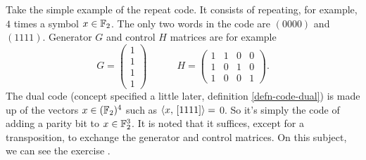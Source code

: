  
\begin{exmp}
Take the simple example of the repeat code. It consists of repeating, for example, $ 4 $ times a symbol $ x \in \mathbb{F}_2 $. The only two words in the code are $ (0000) $ and $ (1111) $. Generator $ G $ and control $ H $ matrices are for example
\begin{equation*}
G = \begin{pmatrix} 1 \\1 \\1 \\1 \end{pmatrix} \quad \quad \quad H = \begin{pmatrix} 1 & 1 & 0 & 0 \\1 & 0 & 1 & 0 \\1 & 0 & 0 & 1 \end{pmatrix}.
\end{equation*}
The dual code (concept specified a little later, definition \ref{defn-code-dual}) is made up of the vectors $ x \in (\mathbb{F}_2)^4 $ such as $ \langle x,\,[1111]\rangle = $ 0. So it's simply the code of adding a parity bit to $ x \in \mathbb{F}_2^3 $. It is noted that it suffices, except for a transposition, to exchange the generator and control matrices. On this subject, we can see the exercise .
\end{exmp}
 
